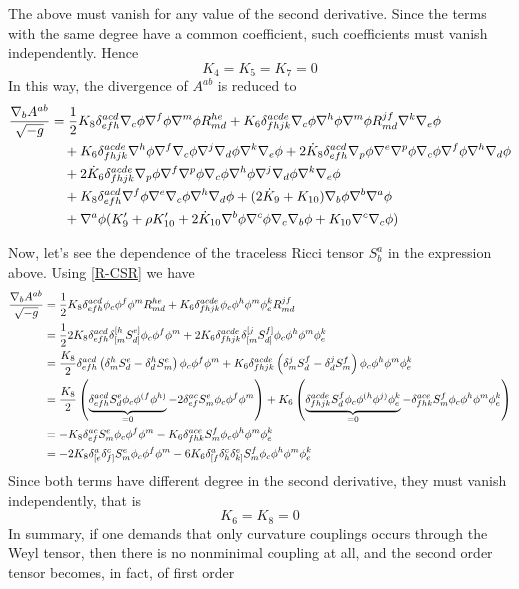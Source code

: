 The above must vanish for any value of the second derivative. Since the terms with the same degree have a common coefficient, such coefficients must vanish independently. Hence
\begin{equation}
  K_4=K_5=K_7=0
\end{equation}
In this way, the divergence of $A^{ab}$ is reduced to
\begin{align*}
    \frac{\nabla_b A^{ab}}{\sqrt{-g}}&= \frac{1}{2}K_8\delta^{acd}_{efh}\nabla_c\phi \nabla^f\phi \nabla^m\phi R^{he}_{md}+K_6\delta^{acde}_{fhjk}\nabla_c\phi \nabla^h\phi \nabla^m\phi R^{jf}_{md}\nabla^k\nabla_e\phi\\&\quad +K_6\delta^{acde}_{fhjk}\nabla^h\phi \nabla^f\nabla_c\phi \nabla^j\nabla_d\phi \nabla^k\nabla_e\phi +2\dot{K}_8\delta^{acd}_{efh}\nabla_p\phi \nabla^{e}\nabla^p\phi \nabla_c\phi\nabla^f\phi\nabla^h\nabla_d\phi \\ &\quad+2\dot{K}_6\delta^{acde}_{fhjk}\nabla_p\phi \nabla^f\nabla^p\phi \nabla_c\phi \nabla^h\phi \nabla^j\nabla_d\phi\nabla^k\nabla_e\phi \\
  &\quad+K_8\delta^{acd}_{efh}\nabla^f\phi\nabla^{e}\nabla_c\phi \nabla^h\nabla_d\phi +(2\dot{K}_9+K_{10})\nabla_b\phi \nabla^b\nabla^{a}\phi \\
  &\quad+\nabla^{a}\phi (K_9'+\rho K_{10}'+2\dot{K}_{10}\nabla^b\phi \nabla^c\phi \nabla_c\nabla_b\phi +K_{10}\nabla^c\nabla_c\phi )
\end{align*}

Now, let's see the dependence of the traceless Ricci tensor $S^{a}_b$ in the expression above. Using \eqref{R-CSR} we have
\begin{align*}
  \frac{\nabla_bA^{ab}}{\sqrt{-g}}&=\frac{1}{2}K_8\delta^{acd}_{efh}\phi_c\phi^f\phi^m R^{he}_{md}+K_6\delta^{acde}_{fhjk}\phi_c\phi^h\phi^m\phi^k_e R^{jf}_{md}\\
  &=\frac{1}{2}2K_8\delta^{acd}_{efh}\delta^{[h}_{[m}S^{e]}_{d]}\phi_c\phi^f\phi^m +2K_6\delta^{acde}_{fhjk}\delta^{[j}_{[m}S^{f]}_{d]}\phi_c\phi^h\phi^m\phi^k_e\\
  &=\frac{K_8}{2}\delta^{acd}_{efh}\left(\delta^h_mS^{e}_d-\delta^h_dS^{e}_m\right)\phi_c\phi^f\phi^m+K_6\delta^{acde}_{fhjk}\left(\delta^j_mS^f_d-\delta^j_dS^f_m\right)\phi_c\phi^h\phi^m\phi^k_e\\
  &=\frac{K_8}{2}\left(\underbrace{\delta^{acd}_{efh}S^{e}_d\phi_c\phi^{(f}\phi^{h)}}_{=0}-2\delta^{ac}_{ef}S^{e}_m\phi_c\phi^f\phi^m\right)+K_6\left(\underbrace{\delta^{acde}_{fhjk}S^f_d\phi_c\phi^{(h}\phi^{j)}\phi^k_e}_{=0}-\delta^{ace}_{fhk}S^f_m\phi_c\phi^h\phi^m\phi^k_e\right)\\
  &=-K_8\delta^{ac}_{ef}S^{e}_m\phi_c\phi^f\phi^m-K_6\delta^{ace}_{fhk}S^f_m\phi_c\phi^h\phi^m\phi^k_e\\
  &=-2K_8\delta^{a}_{[e}\delta^{c}_{f]}S^{e}_m\phi_c\phi^f\phi^m-6K_6\delta^{a}_{[f}\delta^{c}_{h}\delta^{e}_{k]}S^f_m\phi_c\phi^h\phi^m\phi^k_e
\end{align*}
Since both terms have different degree in the second derivative, they must vanish independently, that is 
\begin{equation}
  K_6=K_8=0
\end{equation}
In summary, if one demands that only curvature couplings occurs through the Weyl tensor, then there is no nonminimal coupling at all, and the second order tensor becomes, in fact, of first order

